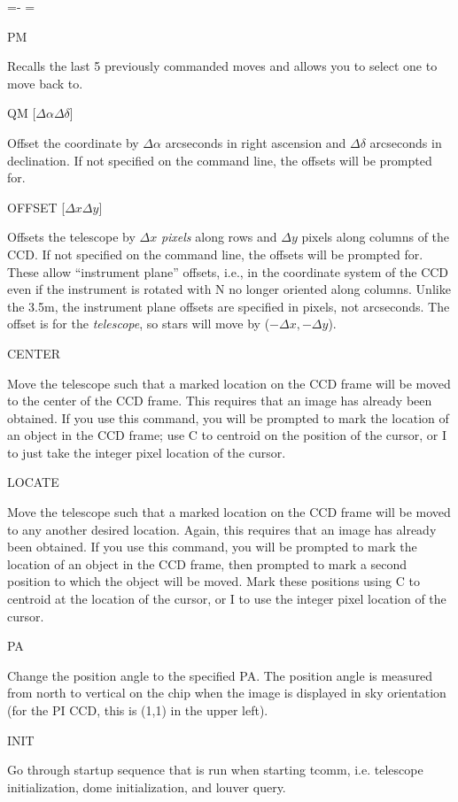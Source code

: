 \documentclass[10pt]{report}
\newenvironment{hanging}{
	\begin{list}{}{
		\labelsep=0pt
		\labelwidth=0pt
		\listparindent=0pt
		\itemindent=-\leftmargini
		\leftmargin=\leftmargini
	}
}{
	\end{list}
}
\begin{document}
\begin{hanging}
\item {PM}

Recalls the last 5 previously commanded moves and allows you to select
one to move back to.

\item{QM [{\it $\Delta\alpha \Delta\delta$}]}

Offset the coordinate by $\Delta\alpha$ arcseconds in right ascension and
$\Delta\delta$ arcseconds in declination. If not specified on the command
line, the offsets will be prompted for.

\item{OFFSET [{\it $\Delta x \Delta y$}]}

Offsets the telescope by $\Delta x$ \textit{pixels} along rows and
$\Delta y$ pixels along columns of the CCD. If not specified on the command
line, the offsets will be prompted for. These allow ``instrument plane''
offsets, i.e., in the coordinate system of the CCD even if the instrument
is rotated with N no longer oriented along columns. Unlike the 3.5m,
the instrument plane offsets are specified in pixels, not arcseconds.
The offset is for the \textit{telescope}, so stars will move by 
($-\Delta x,-\Delta y$).

\item{CENTER}

Move the telescope such that a marked location on the CCD frame will be
moved to the center of the CCD frame. This requires that an image has
already been obtained. If you use this command, you will be prompted to mark the
location of an object in the CCD frame; use C to centroid on the position
of the cursor, or I to just take the integer pixel location of the cursor.

\item{LOCATE}

Move the telescope such that a marked location on the CCD frame will be
moved to any another desired location. Again, this requires that an image
has already been obtained. If you use this command, you will be prompted
to mark the location of an object in the CCD frame, then prompted to
mark a second position to which the object will be moved. Mark these
positions using C to centroid at the location of the cursor, 
or I to use the integer pixel location of the cursor.

\item{PA}

Change the position angle to the specified PA. The position angle is
measured from north to vertical on the chip when the image is displayed
in sky orientation (for the PI CCD, this is (1,1) in the upper left).

\item{INIT}

Go through startup sequence that is run when starting tcomm, i.e.
telescope initialization, dome initialization, and louver query.

%
%
%

\end{hanging}
\end{document}

